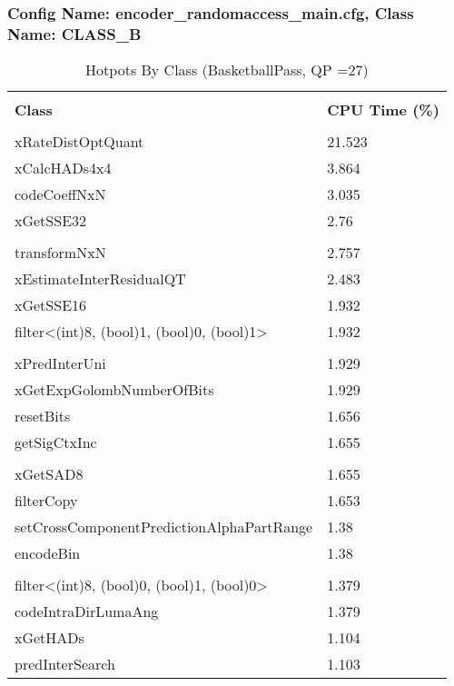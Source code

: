 \documentclass{article}%
\begin{document}
\subsubsection{Config Name: encoder\_randomaccess\_main.cfg, Class Name: CLASS\_B}%
\label{ssubsec:ConfigNameencoderrandomaccessmain.cfg,ClassNameCLASSB}%
\begin{longtabu}{| X[l] | X[l] |}%
\caption{%
Hotpots By Class (BasketballPass, QP =27)%
}%
\hline%
&\\%
\textbf{Class}&\textbf{CPU Time (\%)}\\%
&\\%
\hline%
\endhead%
xRateDistOptQuant&21.523\\%
\hline%
xCalcHADs4x4&3.864\\%
\hline%
codeCoeffNxN&3.035\\%
\hline%
xGetSSE32&2.76\\%
\hline%
&\\%
\hline%
transformNxN&2.757\\%
\hline%
xEstimateInterResidualQT&2.483\\%
\hline%
xGetSSE16&1.932\\%
\hline%
filter<(int)8, (bool)1, (bool)0, (bool)1>&1.932\\%
\hline%
&\\%
\hline%
xPredInterUni&1.929\\%
\hline%
xGetExpGolombNumberOfBits&1.929\\%
\hline%
resetBits&1.656\\%
\hline%
getSigCtxInc&1.655\\%
\hline%
&\\%
\hline%
xGetSAD8&1.655\\%
\hline%
filterCopy&1.653\\%
\hline%
setCrossComponentPredictionAlphaPartRange&1.38\\%
\hline%
encodeBin&1.38\\%
\hline%
&\\%
\hline%
filter<(int)8, (bool)0, (bool)1, (bool)0>&1.379\\%
\hline%
codeIntraDirLumaAng&1.379\\%
\hline%
xGetHADs&1.104\\%
\hline%
predInterSearch&1.103\\%
\hline%
\end{longtabu}%
\newpage%
\end{document}
